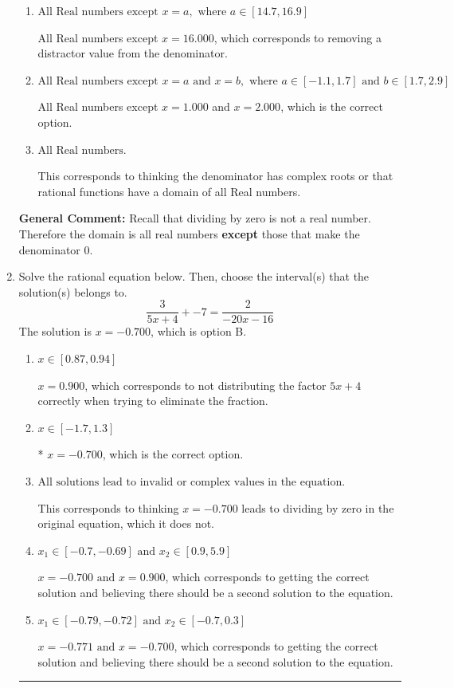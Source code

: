 \documentclass{extbook}[14pt]
\newcommand{\litem}[1]{\item #1

\rule{\textwidth}{0.4pt}}
\begin{document}
\begin{enumerate}
{\begin{enumerate}[label=\Alph*.]
All Real numbers except $x = 1.000$, which corresponds to removing only 1 value from the denominator.
\item \( \text{All Real numbers except } x = a, \text{ where } a \in [14.7, 16.9] \)

All Real numbers except $x = 16.000$, which corresponds to removing a distractor value from the denominator.
\item \( \text{All Real numbers except } x = a \text{ and } x = b, \text{ where } a \in [-1.1, 1.7] \text{ and } b \in [1.7, 2.9] \)

All Real numbers except $x = 1.000$ and $x = 2.000$, which is the correct option.
\item \( \text{All Real numbers.} \)

This corresponds to thinking the denominator has complex roots or that rational functions have a domain of all Real numbers.
\end{enumerate}

\textbf{General Comment:} Recall that dividing by zero is not a real number. Therefore the domain is all real numbers \textbf{except} those that make the denominator 0.
}
\litem{
Solve the rational equation below. Then, choose the interval(s) that the solution(s) belongs to.
\[ \frac{3}{5x + 4} + -7 = \frac{2}{-20x -16} \]The solution is \( x = -0.700 \), which is option B.\begin{enumerate}[label=\Alph*.]
\item \( x \in [0.87,0.94] \)

$x = 0.900$, which corresponds to not distributing the factor $5x + 4$ correctly when trying to eliminate the fraction.
\item \( x \in [-1.7,1.3] \)

* $x = -0.700$, which is the correct option.
\item \( \text{All solutions lead to invalid or complex values in the equation.} \)

This corresponds to thinking $x = -0.700$ leads to dividing by zero in the original equation, which it does not.
\item \( x_1 \in [-0.7, -0.69] \text{ and } x_2 \in [0.9,5.9] \)

$x = -0.700 \text{ and } x = 0.900$, which corresponds to getting the correct solution and believing there should be a second solution to the equation.
\item \( x_1 \in [-0.79, -0.72] \text{ and } x_2 \in [-0.7,0.3] \)

$x = -0.771 \text{ and } x = -0.700$, which corresponds to getting the correct solution and believing there should be a second solution to the equation.
\end{enumerate}

}
\end{enumerate}
\end{document}
